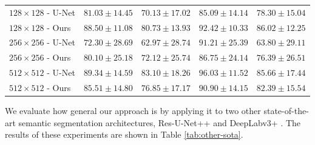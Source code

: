 \begin{table}[t!]
\begin{tabularx}{\textwidth}{lCCCC}
\midrule
$128 \times 128$ - U-Net & $81.03 \pm 14.45$ & $70.13 \pm 17.02$ & $85.09 \pm 14.14$ & $78.30 \pm 15.04$ \\
$128 \times 128$ - Ours & $88.50 \pm 11.08$ & $80.73 \pm 13.93$ & $92.42 \pm 10.33$ & $86.02 \pm 12.25$ \\
\midrule
$256 \times 256$ - U-Net & $72.30 \pm 28.69$ & $62.97 \pm 28.74$ & $91.21 \pm 25.39$ & $63.80 \pm 29.11$ \\
$256 \times 256$ - Ours & $80.10 \pm 25.18$ & $72.12 \pm 25.74$ & $86.75 \pm 24.14$ & $76.39 \pm 26.51$ \\
\midrule
$512 \times 512$ - U-Net & $89.34 \pm 14.59$ & $83.10 \pm 18.26$ & $96.03 \pm 11.52$ & $85.66 \pm 17.44$ \\
$512 \times 512$ - Ours & $85.51 \pm 14.80$ & $76.85 \pm 17.17$ & $90.90 \pm 14.15$ & $82.39 \pm 15.54$ \\
		\end{tabularx}
\end{table}

We evaluate how general our approach is by applying it to two other state-of-the-art semantic segmentation architectures, Res-U-Net++ \cite{jhaResUNetAdvancedArchitecture2019, zhouUNetNestedUNet2018b} and DeepLabv3+ \cite{chenEncoderDecoderAtrousSeparable2018b}. The results of these experiments are shown in Table \ref{tab:other-sota}.

